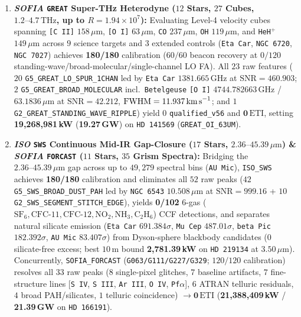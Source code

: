 \documentclass[twocolumn,10pt]{article}
\begin{document}
\begin{enumerate}
  \item \textbf{\textit{SOFIA} \texttt{GREAT} Super-THz Heterodyne ($12$ Stars, $27$ Cubes, $1.2\text{--}4.7\,\text{THz}$, up to $R = 1.94\times 10^7$):} Evaluating Level-4 velocity cubes spanning \texttt{[C\,II]} $158\,\mu\text{m}$, \texttt{[O\,I]} $63\,\mu\text{m}$, \texttt{CO} $237\,\mu\text{m}$, \texttt{OH} $119\,\mu\text{m}$, and \texttt{HeH$^+$} $149\,\mu\text{m}$ across $9$ science targets and $3$ extended controls (\texttt{Eta\,Car}, \texttt{NGC\,6720}, \texttt{NGC\,7027}) achieves \textbf{180/180} calibration ($60/60$ beacon recovery at $0/120$ standing-wave/broad-molecular/single-channel LO FA). All $23$ raw features ($20$ \texttt{G5\_GREAT\_LO\_SPUR\_1CHAN} led by \texttt{Eta\,Car} $1381.665\,\text{GHz}$ at $\mathrm{SNR}=460.903$; $2$ \texttt{G5\_GREAT\_BROAD\_MOLECULAR} incl.\ \texttt{Betelgeuse} \texttt{[O\,I]} $4744.782663\,\text{GHz}$ / $63.1836\,\mu\text{m}$ at $\mathrm{SNR}=42.212$, $\mathrm{FWHM}=11.937\,\text{km\,s}^{-1}$; and $1$ \texttt{G2\_GREAT\_STANDING\_WAVE\_RIPPLE}) yield $0$ \texttt{qualified\_v56} and $\mathbf{0\,\mathrm{ETI}}$, setting \textbf{19,268,981\,kW} (\textbf{19.27\,GW}) on \texttt{HD\,141569} (\texttt{GREAT\_OI\_63UM}).
  \item \textbf{\textit{ISO} \texttt{SWS} Continuous Mid-IR Gap-Closure ($17$ Stars, $2.36\text{--}45.39\,\mu\text{m}$) \& \textit{SOFIA} \texttt{FORCAST} ($11$ Stars, $35$ Grism Spectra):} Bridging the $2.36\text{--}45.39\,\mu\text{m}$ gap across up to $49{,}279$ spectral bins (\texttt{AU\,Mic}), \texttt{ISO\_SWS} achieves \textbf{180/180} calibration and eliminates all $52$ raw peaks ($42$ \texttt{G5\_SWS\_BROAD\_DUST\_PAH} led by \texttt{NGC\,6543} $10.508\,\mu\text{m}$ at $\mathrm{SNR}=999.16$ + $10$ \texttt{G2\_SWS\_SEGMENT\_STITCH\_EDGE}), yields \textbf{0/102} 6-gas ($\mathrm{SF_6, CFC\text{-}11, CFC\text{-}12, NO_2, NH_3, C_2H_6}$) CCF detections, and separates natural silicate emission (\texttt{Eta\,Car} $691.384\sigma$, \texttt{Mu\,Cep} $487.01\sigma$, \texttt{beta\,Pic} $182.392\sigma$, \texttt{AU\,Mic} $83.407\sigma$) from Dyson-sphere blackbody candidates ($0$ silicate-free excess; best $10\,\text{m}$ bound \textbf{2,781.39\,kW} on \texttt{HD\,219134} at $3.50\,\mu\text{m}$). Concurrently, \texttt{SOFIA\_FORCAST} (\texttt{G063/G111/G227/G329}; $120/120$ calibration) resolves all $33$ raw peaks ($8$ single-pixel glitches, $7$ baseline artifacts, $7$ fine-structure lines [\texttt{S\,IV}, \texttt{S\,III}, \texttt{Ar\,III}, \texttt{O\,IV}, \texttt{Pf$\alpha$}], $6$ ATRAN telluric residuals, $4$ broad PAH/silicates, $1$ telluric coincidence) $\rightarrow \mathbf{0\,\mathrm{ETI}}$ (\textbf{21,388,409\,kW} / \textbf{21.39\,GW} on \texttt{HD\,166191}).

\end{enumerate}
\end{document}
